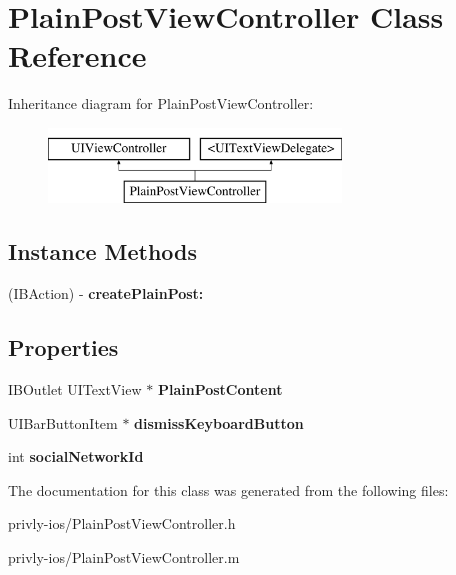 \hypertarget{interface_plain_post_view_controller}{\section{Plain\-Post\-View\-Controller Class Reference}
\label{interface_plain_post_view_controller}
}
Inheritance diagram for Plain\-Post\-View\-Controller\-:\begin{figure}[H]
\begin{center}
\leavevmode
\includegraphics[height=2.000000cm]{interface_plain_post_view_controller}
\end{center}
\end{figure}
\subsection*{Instance Methods}
\begin{DoxyCompactItemize}
\item 
\hypertarget{interface_plain_post_view_controller_a9e60d5caeef9ee119c497cb5d890b7fd}{(I\-B\-Action) -\/ {\bfseries create\-Plain\-Post\-:}}\label{interface_plain_post_view_controller_a9e60d5caeef9ee119c497cb5d890b7fd}

\end{DoxyCompactItemize}
\subsection*{Properties}
\begin{DoxyCompactItemize}
\item 
\hypertarget{interface_plain_post_view_controller_af5675e8c08824561513ce64fc9620a5a}{I\-B\-Outlet U\-I\-Text\-View $\ast$ {\bfseries Plain\-Post\-Content}}\label{interface_plain_post_view_controller_af5675e8c08824561513ce64fc9620a5a}

\item 
\hypertarget{interface_plain_post_view_controller_a6c6d666c2655c0a8ff81f46debfabea6}{U\-I\-Bar\-Button\-Item $\ast$ {\bfseries dismiss\-Keyboard\-Button}}\label{interface_plain_post_view_controller_a6c6d666c2655c0a8ff81f46debfabea6}

\item 
\hypertarget{interface_plain_post_view_controller_a77f64c31823a1aa2e94a6ec3c841b06c}{int {\bfseries social\-Network\-Id}}\label{interface_plain_post_view_controller_a77f64c31823a1aa2e94a6ec3c841b06c}

\end{DoxyCompactItemize}


The documentation for this class was generated from the following files\-:\begin{DoxyCompactItemize}
\item 
privly-\/ios/Plain\-Post\-View\-Controller.\-h\item 
privly-\/ios/Plain\-Post\-View\-Controller.\-m\end{DoxyCompactItemize}
